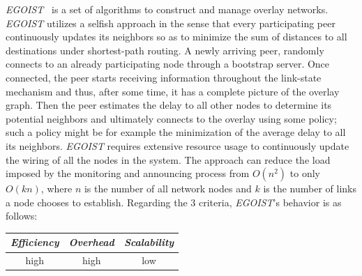 \emph{EGOIST}~\cite{SLLBBR2008} is a set of algorithms 
to construct and manage overlay networks. 
\emph{EGOIST} utilizes a selfish approach in the sense that every participating
peer continuously updates its neighbors so as to minimize the sum of distances
to all destinations under shortest-path routing. 
A newly arriving peer, randomly connects to an already participating 
node through a bootstrap server. 
Once connected, the peer starts receiving information throughout the
link-state mechanism and thus, after some time, 
it has a complete picture of the overlay graph. 
Then the peer estimates the delay to all other nodes to
determine its potential neighbors and ultimately connects 
to the overlay using some policy; such a policy might be 
for example the minimization of the average delay to all its
neighbors. 
\emph{EGOIST} requires extensive resource usage to continuously update the
wiring of all the nodes in the system. 
The approach can reduce the load imposed by the monitoring 
and announcing process from $O(n^2)$ to only $O(kn)$, 
where $n$ is the number of all network nodes 
and $k$ is the number of links a node chooses to establish.
Regarding the $3$ criteria, \emph{EGOIST}'s behavior is as follows:
\begin{center}
{\footnotesize
\begin{tabular}{ccc}
\emph{Efficiency} & \emph{Overhead} & \emph{Scalability} \\
\hline
high &
high &
low
\end{tabular}
}
\end{center}



